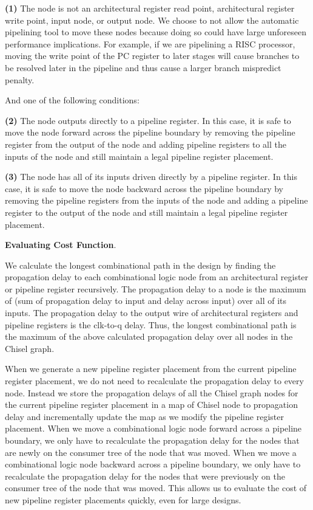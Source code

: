{\bf (1)} 
The node is not an architectural register read point, architectural register write point, input node, or output node. We choose to not allow the automatic pipelining tool to move these nodes because doing so could have large unforeseen performance implications. For example, if we are pipelining a RISC processor, moving the write point of the PC register to later stages will cause branches to be resolved later in the pipeline and thus cause a larger branch mispredict penalty.

And one of the following conditions:

{\bf (2)}  
The node outputs directly to a pipeline register. In this case, it is safe to move the node forward across the pipeline boundary by removing the pipeline register from the output of the node and adding pipeline registers to all the inputs of the node and still maintain a legal pipeline register placement. 

{\bf (3)} 
The node has all of its inputs driven directly by a pipeline register. In this case, it is safe to move the node backward across the pipeline boundary by removing the pipeline registers from the inputs of the node and adding a pipeline register to the output of the node and still maintain a legal pipeline register placement.


{\bf Evaluating Cost Function}.

We calculate the longest combinational path in the design by finding the propagation delay to each combinational logic node from an architectural register or pipeline register recursively. The propagation delay to a node is the maximum of (sum of propagation delay to input and delay across input) over all of its inputs. The propagation delay to the output wire of architectural registers and pipeline registers is the clk-to-q delay.  Thus, the longest combinational path is the maximum of the above calculated propagation delay over all nodes in the Chisel graph.

When we generate a new pipeline register placement from the current pipeline register placement, we do not need to recalculate the propagation delay to every node. Instead we store the propagation delays of all the Chisel graph nodes for the current pipeline register placement in a map of Chisel node to propagation delay and incrementally update the map as we modify the pipeline register placement. When we move a combinational logic node forward across a pipeline boundary, we only have to recalculate the propagation delay for the nodes that are newly on the consumer tree of the node that was moved. When we move a combinational logic node backward across a pipeline boundary, we only have to recalculate the propagation delay for the nodes that were previously on the consumer tree of the node that was moved. This allows us to evaluate the cost of new pipeline register placements quickly, even for large designs.


